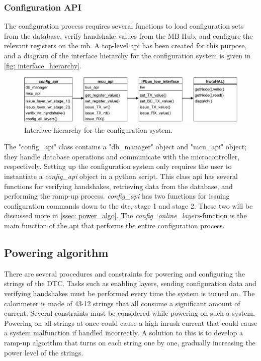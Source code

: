 \documentclass[main.tex]{subfiles}
\begin{document}
\subsubsection{Configuration API}

The configuration process requires several functions to load configuration sets from the database, verify handshake values from the MB Hub, and configure the relevant registers on the \gls{mb}. A top-level \gls{api} has been created for this purpose, and a diagram of the interface hierarchy for the configuration system is given in \autoref{fig: interface_hierarchy}.


\begin{figure}[!ht]
    \centering
    \includegraphics[width=15cm, scale=4]{images/interface_hierarchy.pdf}
    \caption{Interface hierarchy for the configuration system.}
    \label{fig: interface_hierarchy}
\end{figure}
\FloatBarrier

The "config\_api" class contains a "db\_manager" object and "mcu\_api" object; they handle database operations and communicate with the microcontroller, respectively. Setting up the configuration system only requires the user to instantiate a \textit{config\_api} object in a python script. This class \gls{api} has several functions for verifying handshakes, retrieving data from the database, and performing the ramp-up process. \textit{config\_api} has two functions for issuing configuration commands down to the \gls{dtc}, stage 1 and stage 2. These two will be discussed more in \autoref{ssec: power_algo}. The \textit{config\_online\_layers}-function is the main function of the \gls{api} that performs the entire configuration process.



\subsection{Powering algorithm}
\label{ssec: power_algo}
There are several procedures and constraints for powering and configuring the strings of the DTC. Tasks such as enabling layers, sending configuration data and verifying handshakes must be performed every time the system is turned on. The calorimeter is made of 43$\cdot$12 strings that all consume a significant amount of current. Several constraints must be considered while powering on such a system. Powering on all strings at once could cause a high inrush current that could cause a system malfunction if handled incorrectly. A solution to this is to develop a ramp-up algorithm that turns on each string one by one, gradually increasing the power level of the strings. 
\end{document}

